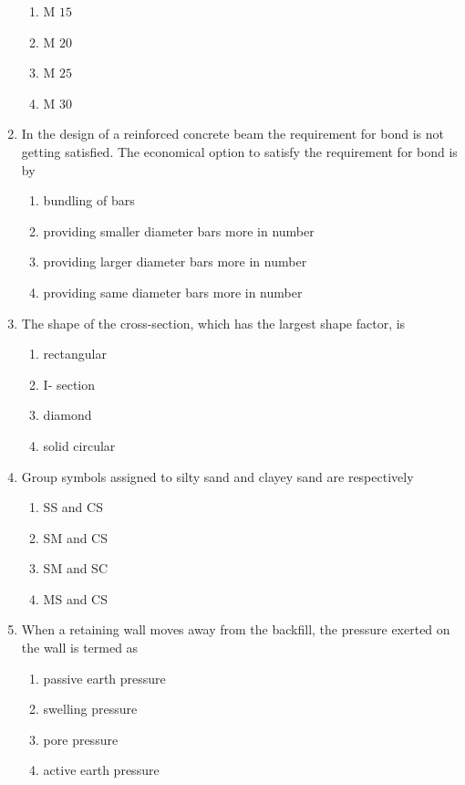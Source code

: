 \documentclass[journal,12pt,onecolumn]{IEEEtran}
\theoremstyle{remark}
\begin{document}
\begin{enumerate}
\begin{enumerate}
	\item M $15$
	\item M $20$
	\item M $25$
	\item M $30$
\end{enumerate}

\item In the design of a reinforced concrete beam the requirement for bond is not getting satisfied. The economical option to satisfy the requirement for bond is by

\begin{enumerate}
	\item bundling of bars
	\item providing smaller diameter bars more in number
	\item providing larger diameter bars more in number
	\item providing same diameter bars more in number
\end{enumerate}

\item The shape of the cross-section, which has the largest shape factor, is

\begin{enumerate}
	\item rectangular
	\item I- section
	\item diamond
	\item solid circular
\end{enumerate}

\item Group symbols assigned to silty sand and clayey sand are respectively

\begin{enumerate}
	\item SS and CS
	\item SM and CS
	\item SM and SC
	\item MS and CS
\end{enumerate}

\item When a retaining wall moves away from the backfill, the pressure exerted on the wall is termed as

\begin{enumerate}
	\item passive earth pressure
	\item swelling pressure
	\item pore pressure
	\item active earth pressure
\end{enumerate}


\end{enumerate}
\end{document}
